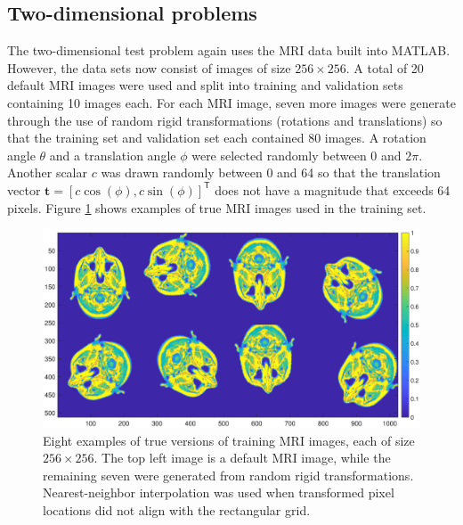 \documentclass[12pt]{article}
\newcommand{\tVec}{\mathbf{t}}	%
\newcommand{\trans}[1]{{#1}^\mathsf{T}}	%
\begin{document}
\subsection{Two-dimensional problems} \label{sec:2D}
The two-dimensional test problem again uses the MRI data built into MATLAB. However, the data sets now consist of images of size $256 \times 256$. A total of 20 default MRI images were used and split into training and validation sets containing 10 images each. For each MRI image, seven more images were generate through the use of random rigid transformations (rotations and translations) so that the training set and validation set each contained 80 images. A rotation angle $\theta$ and a translation angle $\phi$ were selected randomly between 0 and $2\pi$. Another scalar $c$ was drawn randomly between 0 and 64 so that the translation vector $\tVec = \trans{[c\cos(\phi),c\sin(\phi)]}$ does not have a magnitude that exceeds 64 pixels. Figure \ref{fig:MRI Transformations} shows examples of true MRI images used in the training set. 

\begin{figure}[ht]
\includegraphics[scale=0.36]{Figures/MRI_Transformations}
\caption{Eight examples of true versions of training MRI images, each of size $256 \times 256$. The top left image is a default MRI image, while the remaining seven were generated from random rigid transformations. Nearest-neighbor interpolation was used when transformed pixel locations did not align with the rectangular grid.}
\label{fig:MRI Transformations}
\end{figure}
\end{document}
